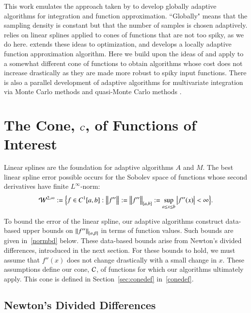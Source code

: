 \documentclass[review]{elsarticle}
\theoremstyle{definition}
\begin{document}
This work emulates the approach taken by \cite{HicEtal14b} to develop globally adaptive algorithms for integration and function approximation.  ``Globally" means that the sampling density is constant but that the number of samples is chosen adaptively.  \cite{HicEtal14b} relies on linear splines applied to cones of functions that are not too spiky, as we do here.  \cite{Ton14a} extends these ideas to optimization, and \cite{Din15a} develops a locally adaptive function approximation algorithm.  Here we build upon the ideas of \cite{Din15a} and apply to a somewhat different cone of functions to obtain algorithms whose cost does not increase drastically as they are made more robust to spiky input functions.  There is also a parallel development of adaptive algorithms for multivariate integration via Monte Carlo methods \citep{HicEtal14a, Jia16a} and quasi-Monte Carlo methods \citep{HicJim16a,JimHic16a}.

\section{The Cone, $\cc$, of Functions of Interest} \label{sec:cone}

Linear splines are the foundation for adaptive algorithms $A$ and $M$. The best linear spline error possible occurs for the Sobolev space of functions whose second derivatives have finite $L^{\infty}$-norm:
\[
\cw^{2,\infty} := \Bigl \{f \in C^1[a,b] : \norm{f''} : = \norm[{[a,b]}]{f''} : = \sup_{a \le x \le b} \abs{f''(x)} <  \infty \Bigr\}.
\]

To bound the error of the linear spline, our adaptive algorithms construct data-based upper bounds on $\norm[{[\alpha,
\beta]}]{f''}$ in terms of function values.  Such bounds are given in~\eqref{normbd} below.  These data-based bounds arise from Newton's divided differences, introduced in the next section.  For these bounds to hold, we must  assume that $f''(x)$ does not change drastically with a small change in $x$.  These assumptions define our cone, $\cc$, of functions for which our algorithms ultimately apply.  This cone is defined in Section~\ref{sec:conedef} in~\eqref{conedef}.

\subsection{Newton's Divided Differences} \label{sec:ndd}
\end{document}
